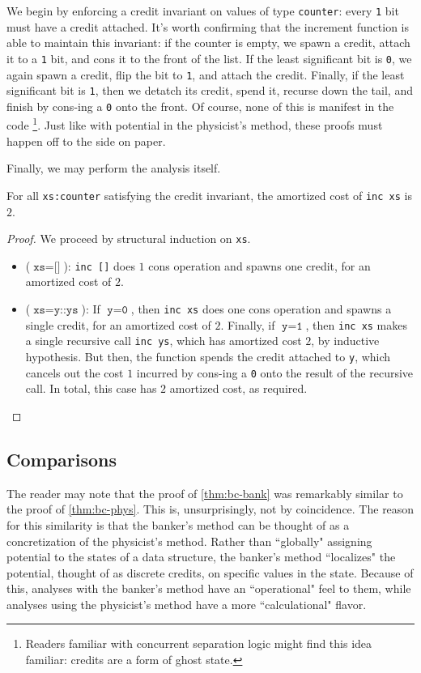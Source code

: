 We begin by enforcing a credit invariant on values of type \texttt{counter}: every \texttt{1} bit must have a credit attached. It's worth confirming that the increment function is able to maintain this invariant: if the counter is empty, we spawn a credit, attach it to a \texttt{1} bit, and cons it to the front of the list.
If the least significant bit is \texttt{0}, we again spawn a credit, flip the bit to \texttt{1}, and attach the credit. Finally, if the least significant bit is \texttt{1}, then we detatch its credit, spend it, recurse down the tail, and finish by cons-ing a \texttt{0} onto the front. Of course, none of this is manifest in the code
\footnote{
Readers familiar with concurrent separation logic might find this idea familiar: credits are a form of ghost state.
}.
Just like with potential in the physicist's method, these proofs must happen off to the side on paper.

Finally, we may perform the analysis itself.

\begin{theorem}
For all \texttt{xs:counter} satisfying the credit invariant, the amortized cost of \texttt{inc xs} is $2$.
\end{theorem}
\label{thm:bc-bank}
\begin{proof}
We proceed by structural induction on \texttt{xs}.
\begin{itemize}
  \item ($\texttt{xs} = \texttt{[]}$): \texttt{inc []} does $1$ cons operation and spawns one credit, for an amortized cost of $2$.
  \item ($\texttt{xs} = \texttt{y::ys}$): If $\texttt{y} = \texttt{0}$, then \texttt{inc xs} does one cons operation and spawns a single credit, for an amortized cost of $2$. Finally, if $\texttt{y} = \texttt{1}$, then \texttt{inc xs} makes a single recursive call \texttt{inc ys}, which has amortized cost $2$, by inductive hypothesis. But then, the function spends the credit attached to \texttt{y}, which cancels out the cost $1$ incurred by cons-ing a \texttt{0} onto the result of the recursive call. In total, this case has $2$ amortized cost, as required.
\end{itemize}
\end{proof}

\subsection{Comparisons}

The reader may note that the proof of \autoref{thm:bc-bank} was remarkably similar to the proof of \autoref{thm:bc-phys}. This is, unsurprisingly, not by coincidence. The reason for this similarity is that the banker's method can be thought of as a concretization of the physicist's method. Rather than ``globally" assigning potential to the states of a data structure, the banker's method ``localizes" the potential, thought of as discrete credits, on  specific values in the state. Because of this, analyses with the banker's method have an ``operational" feel to them, while analyses using the physicist's method have a more ``calculational" flavor.

